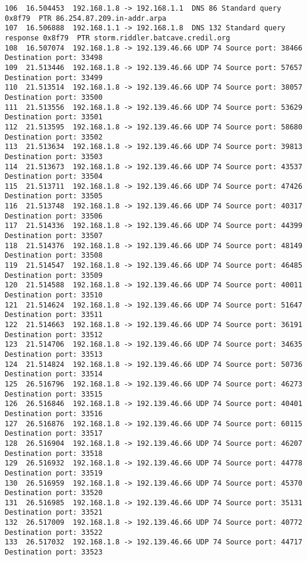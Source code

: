 \documentclass[a4paper]{report} %
\begin{document}
\begin{lstlisting}
106  16.504453  192.168.1.8 -> 192.168.1.1  DNS 86 Standard query 0x8f79  PTR 86.254.87.209.in-addr.arpa
107  16.506888  192.168.1.1 -> 192.168.1.8  DNS 132 Standard query response 0x8f79  PTR storm.riddler.batcave.credil.org
108  16.507074  192.168.1.8 -> 192.139.46.66 UDP 74 Source port: 38466  Destination port: 33498
109  21.513446  192.168.1.8 -> 192.139.46.66 UDP 74 Source port: 57657  Destination port: 33499
110  21.513514  192.168.1.8 -> 192.139.46.66 UDP 74 Source port: 38057  Destination port: 33500
111  21.513556  192.168.1.8 -> 192.139.46.66 UDP 74 Source port: 53629  Destination port: 33501
112  21.513595  192.168.1.8 -> 192.139.46.66 UDP 74 Source port: 58680  Destination port: 33502
113  21.513634  192.168.1.8 -> 192.139.46.66 UDP 74 Source port: 39813  Destination port: 33503
114  21.513673  192.168.1.8 -> 192.139.46.66 UDP 74 Source port: 43537  Destination port: 33504
115  21.513711  192.168.1.8 -> 192.139.46.66 UDP 74 Source port: 47426  Destination port: 33505
116  21.513748  192.168.1.8 -> 192.139.46.66 UDP 74 Source port: 40317  Destination port: 33506
117  21.514336  192.168.1.8 -> 192.139.46.66 UDP 74 Source port: 44399  Destination port: 33507
118  21.514376  192.168.1.8 -> 192.139.46.66 UDP 74 Source port: 48149  Destination port: 33508
119  21.514547  192.168.1.8 -> 192.139.46.66 UDP 74 Source port: 46485  Destination port: 33509
120  21.514588  192.168.1.8 -> 192.139.46.66 UDP 74 Source port: 40011  Destination port: 33510
121  21.514624  192.168.1.8 -> 192.139.46.66 UDP 74 Source port: 51647  Destination port: 33511
122  21.514663  192.168.1.8 -> 192.139.46.66 UDP 74 Source port: 36191  Destination port: 33512
123  21.514706  192.168.1.8 -> 192.139.46.66 UDP 74 Source port: 34635  Destination port: 33513
124  21.514824  192.168.1.8 -> 192.139.46.66 UDP 74 Source port: 50736  Destination port: 33514
125  26.516796  192.168.1.8 -> 192.139.46.66 UDP 74 Source port: 46273  Destination port: 33515
126  26.516846  192.168.1.8 -> 192.139.46.66 UDP 74 Source port: 40401  Destination port: 33516
127  26.516876  192.168.1.8 -> 192.139.46.66 UDP 74 Source port: 60115  Destination port: 33517
128  26.516904  192.168.1.8 -> 192.139.46.66 UDP 74 Source port: 46207  Destination port: 33518
129  26.516932  192.168.1.8 -> 192.139.46.66 UDP 74 Source port: 44778  Destination port: 33519
130  26.516959  192.168.1.8 -> 192.139.46.66 UDP 74 Source port: 45370  Destination port: 33520
131  26.516985  192.168.1.8 -> 192.139.46.66 UDP 74 Source port: 35131  Destination port: 33521
132  26.517009  192.168.1.8 -> 192.139.46.66 UDP 74 Source port: 40772  Destination port: 33522
133  26.517032  192.168.1.8 -> 192.139.46.66 UDP 74 Source port: 44717  Destination port: 33523

\end{lstlisting}
	
\end{document}
